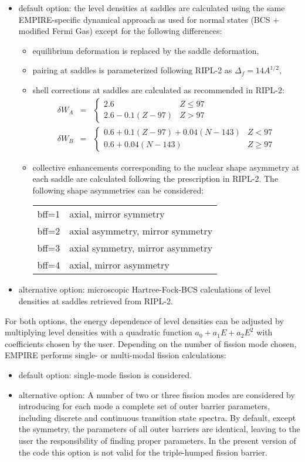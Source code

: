 \documentclass[twocolumn,amsmath,amssymb,10pt,groupedaddress,a4paper]{revtex4}
\begin{document}
\begin{itemize}
\item default option: the level densities at saddles are calculated
using the same EMPIRE-specific dynamical approach as used for normal
states (BCS + modified Fermi Gas) except for the following differences:
\begin{itemize}
\item equilibrium deformation is replaced by the saddle deformation,
\item pairing at saddles is parameterized following RIPL-2 as $\Delta_{f}=14A^{1/2}$,
\item shell corrections at saddles are calculated as recommended in RIPL-2:
\begin{eqnarray}
\delta W_{A}&=&\left\{ \begin{array}{lr}
2.6 & Z\leq97\\
2.6-0.1(Z-97) & Z>97\end{array}\right.\nonumber\\
\delta W_{B}&=&\left\{ \begin{array}{lr}
0.6+0.1(Z-97)+0.04(N-143) & Z<97\\
0.6+0.04(N-143) & Z\geq97\end{array}\right.\nonumber
\end{eqnarray}
\item collective enhancements corresponding to the nuclear shape asymmetry
at each saddle are calculated following the prescription in RIPL-2.
The following shape asymmetries can be considered:
\begin{tabular}{ll}
 bff=1 &
 axial, mirror symmetry\tabularnewline
 bff=2 &
 axial asymmetry, mirror symmetry\tabularnewline
 bff=3 &
 axial symmetry, mirror asymmetry\tabularnewline
 bff=4 &
 axial, mirror asymmetry \tabularnewline
\end{tabular}
\end{itemize}

\item alternative option: microscopic Hartree-Fock-BCS calculations of level densities
at saddles retrieved from RIPL-2.
\end{itemize}
For both options, the energy dependence of level densities
can be adjusted by multiplying level densities with a quadratic function
$a_{0}+a_{1}E+a_{2}E^{2}$ with coefficients chosen by the user.
Depending on the number of fission mode chosen, EMPIRE performs
single- or multi-modal fission calculations:
\begin{itemize}
\item default option: single-mode fission is considered.
\item alternative option: A number of two or three  fission modes are considered by
introducing for each mode a complete set of outer barrier parameters,
including discrete and continuous transition state spectra.
By default, except the symmetry,
the parameters of all outer barriers are identical, leaving to the
user the responsibility of finding proper parameters. In the present
version of the code this option is not valid for the triple-humped
fission barrier.
\end{itemize}
\end{document}
